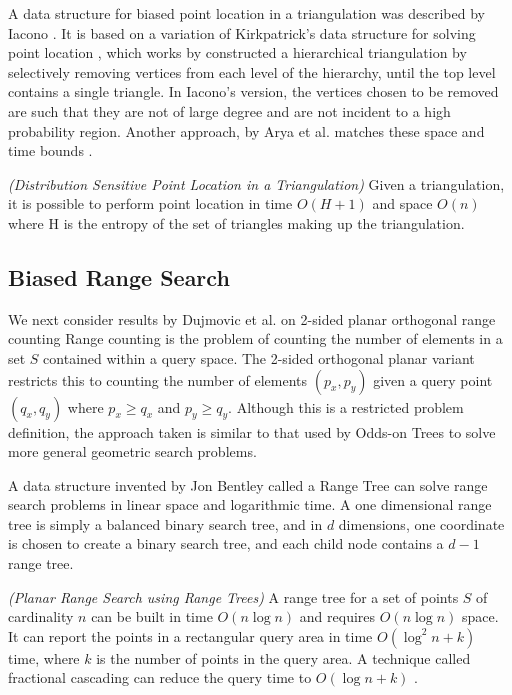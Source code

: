 \documentclass[mcs]{scsthesis}
\begin{document}
A data structure for biased point location in a triangulation was described
by Iacono \cite{iacono}. It is based on a variation of Kirkpatrick's data
structure for solving point location \cite{kirkpatrick}, which works by
constructed a hierarchical triangulation by selectively removing vertices
from each level of the hierarchy, until the top level contains a single triangle.
In Iacono's version, the vertices chosen to be removed are such that they are
not of large degree and are not incident to a high probability region. Another
approach, by Arya et al. matches these space and time bounds \cite{simpleentropy}.

\begin{thm} \emph{(Distribution Sensitive Point Location in a Triangulation)} 
Given a triangulation, it is possible to perform point location in time
\(O(H + 1)\) and space \(O(n)\) where H is the entropy of the set of triangles
making up the triangulation. 
\end{thm}

\subsection{Biased Range Search}

We next consider results by Dujmovic et al. \cite{biasedrange} on 2-sided
planar orthogonal range counting Range counting is the problem of counting the
number of elements in a set \(S\) contained within a query space. The 2-sided
orthogonal planar variant restricts this to counting the number of elements
\((p_x, p_y)\) given a query point \((q_x, q_y)\) where \(p_x \ge q_x\) and
\(p_y \ge q_y\). Although this is a restricted problem definition, the approach
taken is similar to that used by Odds-on Trees to solve more general geometric 
search problems.

A data structure invented by Jon Bentley \cite{rangetree} called a Range Tree
can solve range search problems in linear space and logarithmic time. A one
dimensional range tree is simply a balanced binary search tree, and in \(d\)
dimensions, one coordinate is chosen to create a binary search tree, and each
child node contains a \(d - 1\) range tree. 

\begin{thm} \emph{(Planar Range Search using Range Trees)} 
A range tree for a set of points \(S\) of cardinality \(n\) can be built in
time \(O(n \log n)\) and requires \(O(n \log n)\) space. It can report the
points in a rectangular query area in time \(O(\log^2 n + k)\) time, where
\(k\) is the number of points in the query area. A technique called
fractional cascading can reduce the query time to \(O(\log n + k)\)
\cite{dutch}. 
\end{thm}
\end{document}
